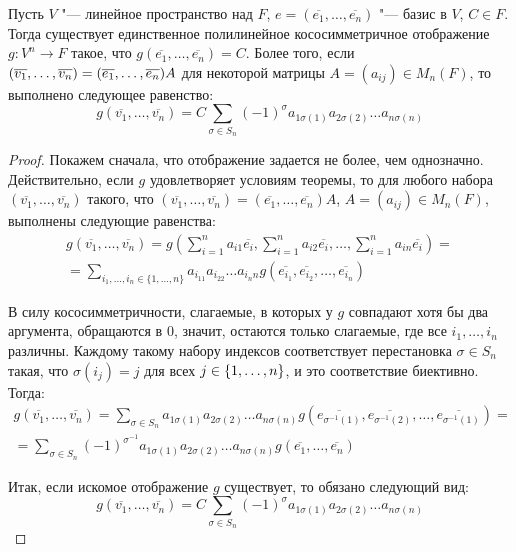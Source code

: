 \begin{theorem}
	Пусть $V$ "--- линейное пространство над $F$, $e = (\overline{e_1}, \dots, \overline{e_n})$ "--- базис в $V$, $C \in F$. Тогда существует единственное полилинейное кососимметричное отображение $g: V^n \to F$ такое, что $g(\overline{e_1}, \dots, \overline{e_n}) = C$. Более того, если $(\overline{v_1}, \dots, \overline{v_n}) \hm{=} (\overline{e_1}, \dots, \overline{e_n})A$ для некоторой матрицы $A = (a_{ij}) \in M_n(F)$, то выполнено следующее равенство:
	\[g(\overline{v_1}, \dots, \overline{v_n}) = C\sum_{\sigma \in S_n}(-1)^\sigma a_{1 \sigma(1)}a_{2 \sigma(2)}\dots a_{n \sigma(n)}\]
\end{theorem}

\begin{proof}
	Покажем сначала, что отображение задается не более, чем однозначно. Действительно, если $g$ удовлетворяет условиям теоремы, \pagebreak то для любого набора $(\overline{v_1}, \dots, \overline{v_n})$ такого, что $(\overline{v_1}, \dots, \overline{v_n}) = (\overline{e_1}, \dots, \overline{e_n})A$, $A = (a_{ij}) \in M_n(F)$, выполнены следующие равенства:
	\begin{multline*}
		g(\overline{v_1}, \dots, \overline{v_n}) = g\left(\sum_{i = 1}^{n}a_{i1}\overline{e_i}, \sum_{i = 1}^{n}a_{i2}\overline{e_i}, \dots, \sum_{i = 1}^{n}a_{in}\overline{e_i}\right) = \\
		= \sum_{i_1, \dots, i_n \in \{1, \dots, n\}}a_{i_11}a_{i_22}\dots a_{i_nn}g(\overline{e_{i_1}}, \overline{e_{i_2}}, \dots, \overline{e_{i_n}})
	\end{multline*}
	
	В силу кососимметричности, слагаемые, в которых у $g$ совпадают хотя бы два аргумента, обращаются в $0$, значит, остаются только слагаемые, где все $i_1, \dots, i_n$ различны. Каждому такому набору индексов соответствует перестановка $\sigma \in S_n$ такая, что $\sigma(i_j) = j$ для всех $j \in \{1, \dotsc, n\}$, и это соответствие биективно. Тогда:
	\begin{multline*}
		g(\overline{v_1}, \dots, \overline{v_n}) = \sum_{\sigma \in S_n}a_{1 \sigma(1)}a_{2 \sigma(2)}\dots a_{n \sigma(n)}g(\overline{e_{\sigma^{-1}(1)}}, \overline{e_{\sigma^{-1}(2)}}, \dots, \overline{e_{\sigma^{-1}(1)}}) = \\
		= \sum_{\sigma \in S_n}(-1)^{\sigma^{-1}}a_{1 \sigma(1)}a_{2 \sigma(2)}\dots a_{n \sigma(n)}g(\overline{e_1}, \dots, \overline{e_n})
	\end{multline*}
	
	Итак, если искомое отображение $g$ существует, то обязано следующий вид:
	\[g(\overline{v_1}, \dots, \overline{v_n}) = C\sum_{\sigma \in S_n}(-1)^\sigma a_{1 \sigma(1)}a_{2 \sigma(2)}\dots a_{n \sigma(n)}\]
		

\end{proof}
